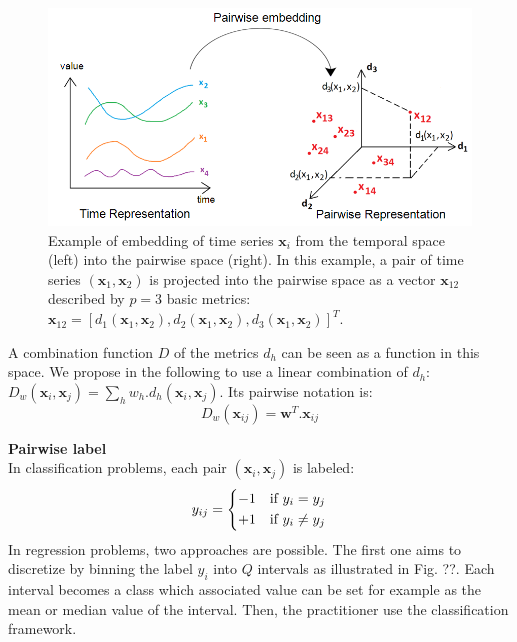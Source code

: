 \begin{figure}[h!]
	\begin{minipage}[b]{1.0\linewidth}
		\centering
		\includegraphics[width=0.8\linewidth]{images/PairwiseEmbedding}
	\end{minipage}
	\caption{Example of embedding of time series $\textbf{x}_i$ from the temporal space (left) into the pairwise space (right). In this example, a pair of time series $(\textbf{x}_1, \textbf{x}_2)$ is projected into the pairwise space as a vector $\textbf{x}_{12}$ described by $p=3$ basic metrics: $\textbf{x}_{12} = [d_1(\textbf{x}_1, \textbf{x}_2), d_2(\textbf{x}_1, \textbf{x}_2), d_3(\textbf{x}_1, \textbf{x}_2)]^T$.}
	\label{fig:PairwiseEmbedding}
\end{figure}

A combination function $D$ of the metrics $d_h$ can be seen as a function in this space. We propose in the following to use a linear combination of $d_h$: $D_w(\textbf{x}_i,\textbf{x}_j) = \sum_h w_h.d_h(\textbf{x}_i,\textbf{x}_j)$. Its pairwise notation is:
\begin{equation}
D_w(\textbf{x}_{ij})=\textbf{w}^T.\textbf{x}_{ij}
\end{equation}



\noindent \textbf{Pairwise label} \\
In classification problems, each pair $(\textbf{x}_i,\textbf{x}_j)$ is labeled:
\begin{equation}
	y_{ij} = 
	\left\{
	\begin{split}
	-1 \text{\quad if } y_i = y_j\\ 
	+1 \text{\quad if } y_i \neq y_j
	\end{split}
	\right.
\end{equation}
In regression problems, two approaches are possible. The first one aims to discretize by binning the label $y_i$ into $Q$ intervals as illustrated in Fig. ??. Each interval becomes a class which associated value can be set for example as the mean or median value of the interval. Then, the practitioner use the classification framework.


